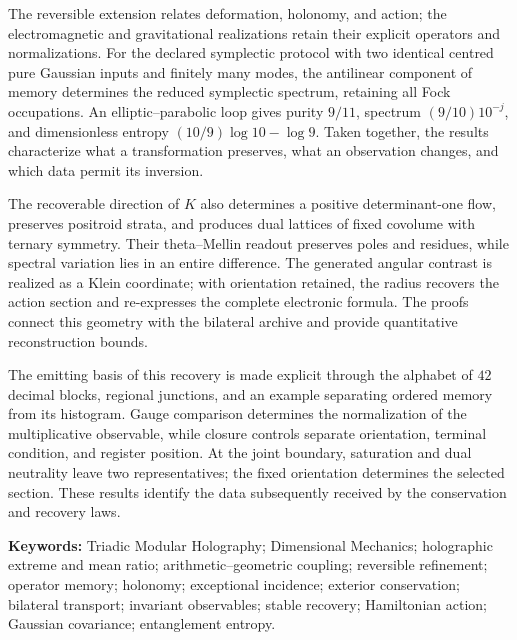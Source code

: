 The reversible extension relates deformation, holonomy, and action; the electromagnetic and gravitational realizations retain their explicit operators and normalizations. For the declared symplectic protocol with two identical centred pure Gaussian inputs and finitely many modes, the antilinear component of memory determines the reduced symplectic spectrum, retaining all Fock occupations. An elliptic--parabolic loop gives purity \(9/11\), spectrum \((9/10)10^{-j}\), and dimensionless entropy \((10/9)\log10-\log9\). Taken together, the results characterize what a transformation preserves, what an observation changes, and which data permit its inversion.

\medskip
The recoverable direction of \(K\) also determines a positive determinant-one flow, preserves positroid strata, and produces dual lattices of fixed covolume with ternary symmetry. Their theta--Mellin readout preserves poles and residues, while spectral variation lies in an entire difference. The generated angular contrast is realized as a Klein coordinate; with orientation retained, the radius recovers the action section and re-expresses the complete electronic formula. The proofs connect this geometry with the bilateral archive and provide quantitative reconstruction bounds.


The emitting basis of this recovery is made explicit through the alphabet
of \(42\) decimal blocks, regional junctions, and an example separating
ordered memory from its histogram. Gauge comparison determines the
normalization of the multiplicative observable, while closure controls
separate orientation, terminal condition, and register position. At the
joint boundary, saturation and dual neutrality leave two representatives;
the fixed orientation determines the selected section. These results
identify the data subsequently received by the conservation and
recovery laws.

\noindent\textbf{Keywords:} Triadic Modular Holography; Dimensional Mechanics; holographic extreme and mean ratio; arithmetic--geometric coupling; reversible refinement; operator memory; holonomy; exceptional incidence; exterior conservation; bilateral transport; invariant observables; stable recovery; Hamiltonian action; Gaussian covariance; entanglement entropy.
